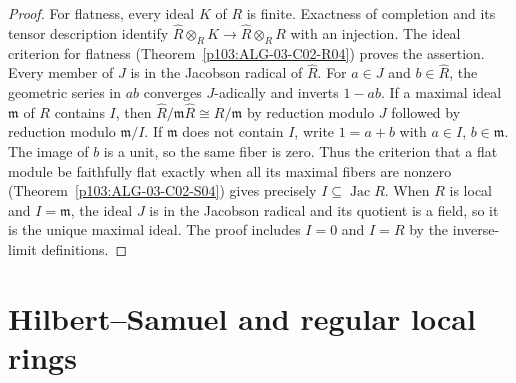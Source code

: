 \documentclass[11pt,oneside,openany]{book}
\theoremstyle{definition}
\theoremstyle{remark}
\begin{document}
\begin{proof}
For flatness, every ideal \(K\) of \(R\) is finite. Exactness of completion and its tensor description identify \(\widehat R\otimes_R K\to\widehat R\otimes_R R\) with an injection. The ideal criterion for flatness (Theorem~\ref{p103:ALG-03-C02-R04}) proves the assertion. Every member of \(J\) is in the Jacobson radical of \(\widehat R\). For \(a\in J\) and \(b\in\widehat R\), the geometric series in \(ab\) converges \(J\)-adically and inverts \(1-ab\). If a maximal ideal \(\mathfrak m\) of \(R\) contains \(I\), then \(\widehat R/\mathfrak m\widehat R\cong R/\mathfrak m\) by reduction modulo \(J\) followed by reduction modulo \(\mathfrak m/I\). If \(\mathfrak m\) does not contain \(I\), write \(1=a+b\) with \(a\in I\), \(b\in\mathfrak m\). The image of \(b\) is a unit, so the same fiber is zero. Thus the criterion that a flat module be faithfully flat exactly when all its maximal fibers are nonzero (Theorem~\ref{p103:ALG-03-C02-S04}) gives precisely \(I\subseteq\operatorname{Jac}R\). When \(R\) is local and \(I=\mathfrak m\), the ideal \(J\) is in the Jacobson radical and its quotient is a field, so it is the unique maximal ideal. The proof includes \(I=0\) and \(I=R\) by the inverse-limit definitions.
\end{proof}

\section{Hilbert--Samuel and regular local rings}
\end{document}
